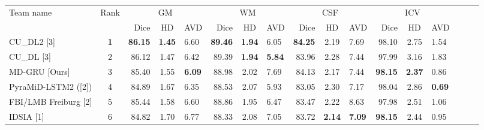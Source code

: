 \documentclass[a4paper,9pt]{llncs}
\begin{document}
\begin{table}
\begin{center}
\label{mrbrainsres}
 \scriptsize
\begin{tabular}{l c rcl rcl rcl rcl rcl}
\toprule
Team name &  Rank &\multicolumn{3}{c}{GM} & \multicolumn{3}{c}{WM} & \multicolumn{3}{c}{CSF} &  \multicolumn{3}{c}{ICV}\\%
&  & Dice & HD & AVD & Dice & HD & AVD & Dice & HD & AVD & Dice & HD & AVD \\\midrule
CU\_DL2 [3] & \textbf{1}& \textbf{86.15} & \textbf{1.45} & 6.60 & \textbf{89.46} & \textbf{1.94} & 6.05 & \textbf{84.25}& 2.19 & 7.69 &  98.10 & 2.75 & 1.54\\
CU\_DL [3]& 2  & 86.12 & 1.47 & 6.42 & 89.39 & \textbf{1.94} & \textbf{5.84} & 83.96 & 2.28 & 7.44 &  97.99 & 3.16 & 1.83 \\
MD-GRU [Ours] & 3 & 85.40 & 1.55 & \textbf{6.09} & 88.98 & 2.02 & 7.69 & 84.13 & 2.17 & 7.44 & \textbf{98.15} & \textbf{2.37} & 0.86\\
PyraMiD-LSTM2 ([2])& 4 & 84.89 & 1.67 & 6.35 & 88.53 & 2.07 & 5.93 & 83.05 & 2.30 & 7.17 &  98.04 & 2.86 & \textbf{0.69}\\
FBI/LMB Freiburg [2]& 5 & 85.44 & 1.58 & 6.60 & 88.86 & 1.95 & 6.47 & 83.47 & 2.22 & 8.63 &  97.98 & 2.51 & 1.06\\
IDSIA [1]& 6 & 84.82 & 1.70 & 6.77 & 88.33 & 2.08 & 7.05& 83.72 & \textbf{2.14} & \textbf{7.09}& \textbf{98.15} & 2.44 & 0.95\\\bottomrule
\end{tabular}
\end{center}
 \label{resultschallenge}
\end{table}
\end{document}
